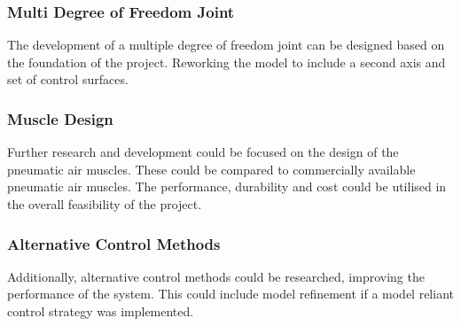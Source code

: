 \documentclass[11pt,a4paper]{article}
\begin{document}
\subsubsection{Multi Degree of Freedom Joint}
\label{sub:two_dof_joint}
The development of a multiple degree of freedom joint can be designed based on the foundation of the project. Reworking the model to include a second axis and set of control surfaces.

\subsubsection{Muscle Design}
\label{sub:future_muscle_design}
Further research and development could be focused on the design of the pneumatic air muscles. These could be compared to commercially available pneumatic air muscles. The performance, durability and cost could be utilised in the overall feasibility of the project.

\subsubsection{Alternative Control Methods}
\label{sub:alternative_control_methods}
Additionally, alternative control methods could be researched, improving the performance of the system. This could include model refinement if a model reliant control strategy was implemented. 
\end{document}
